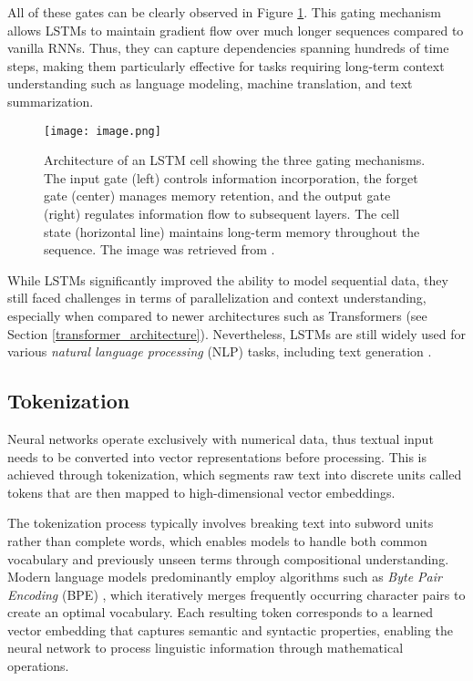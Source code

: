 All of these gates can be clearly observed in Figure \ref{fig:lstm-architecture}. This gating mechanism allows LSTMs to maintain gradient flow over much longer sequences compared to vanilla RNNs. Thus, they can capture dependencies spanning hundreds of time steps, making them particularly effective for tasks requiring long-term context understanding such as language modeling, machine translation, and text summarization.
\begin{figure}[!htbp]
\centering
\texttt{[image: image.png]}
\caption[LSTM cell architecture]{Architecture of an LSTM cell showing the three gating mechanisms. The input gate (left) controls information incorporation, the forget gate (center) manages memory retention, and the output gate (right) regulates information flow to subsequent layers. The cell state (horizontal line) maintains long-term memory throughout the sequence. The image was retrieved from \cite{hinton-lstm}.}
\label{fig:lstm-architecture}
\end{figure}

While LSTMs significantly improved the ability to model sequential data, they still faced challenges in terms of parallelization and context understanding, especially when compared to newer architectures such as Transformers (see Section \ref{transformer_architecture}).  Nevertheless, LSTMs are still widely used for various \textit{natural language processing} (NLP) tasks, including text generation \cite{lstm_textgeneration}.

\subsection{Tokenization}

Neural networks operate exclusively with numerical data, thus textual input needs to be converted into vector representations before processing. This is achieved through tokenization, which segments raw text into discrete units called tokens that are then mapped to high-dimensional vector embeddings.

The tokenization process typically involves breaking text into subword units rather than complete words, which enables models to handle both common vocabulary and previously unseen terms through compositional understanding. Modern language models predominantly employ algorithms such as \textit{Byte Pair Encoding} (BPE) \cite{bpe}, which iteratively merges frequently occurring character pairs to create an optimal vocabulary. Each resulting token corresponds to a learned vector embedding that captures semantic and syntactic properties, enabling the neural network to process linguistic information through mathematical operations.

